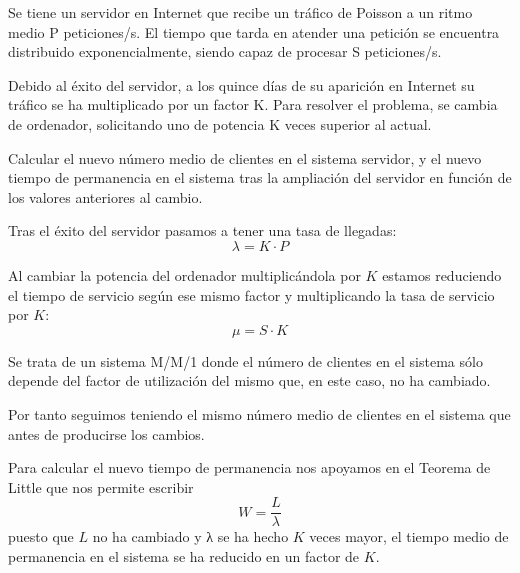 \begin{problem}[2]
Se tiene un servidor en Internet que recibe un tráfico de Poisson a un ritmo medio P peticiones/s. El tiempo que tarda en atender una petición se encuentra distribuido exponencialmente, siendo capaz de procesar S peticiones/s.

Debido al éxito del servidor, a los quince días de su aparición en Internet su tráfico se ha multiplicado por un factor K. Para resolver el problema, se cambia de ordenador, solicitando uno de potencia K veces superior al actual.

Calcular el nuevo número medio de clientes en el sistema servidor, y el nuevo tiempo de permanencia en el sistema tras la ampliación del servidor en función de los valores anteriores al cambio.

\solution

\yoP


Tras el éxito del servidor pasamos a tener una tasa de llegadas:
\[λ = K \cdot P\]

Al cambiar la potencia del ordenador multiplicándola por $K$ estamos reduciendo el tiempo de servicio según ese mismo factor y multiplicando la tasa de servicio por $K$:
\[μ = S \cdot K\]

Se trata de un sistema M/M/1 donde el número de clientes en el sistema sólo depende del factor de utilización del mismo que, en este caso, no ha cambiado.

Por tanto seguimos teniendo el mismo número medio de clientes en el sistema que antes de producirse los cambios.

Para calcular el nuevo tiempo de permanencia nos apoyamos en el Teorema de Little que nos permite escribir
\[W = \frac{L}{λ}\]
puesto que $L$ no ha cambiado y λ se ha hecho $K$ veces mayor, el tiempo medio de permanencia en el sistema se ha reducido en un factor de $K$.

\end{problem}


